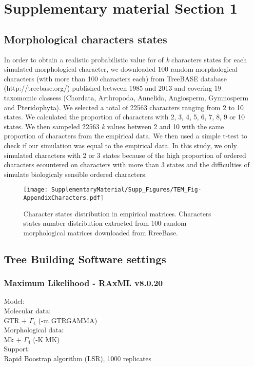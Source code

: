 \section{Supplementary material Section 1}

\subsection{Morphological characters states}
In order to obtain a realistic probabilistic value for of \textit{k} characters states for each simulated morphological character, we downloaded 100 random morphological characters (with more than 100 characters each) from TreeBASE database (http://treebase.org/) published between 1985 and 2013 and covering 19 taxomomic classess (Chordata, Arthropoda, Annelida, Angiosperm, Gymnosperm and Pteridophyta).
We selected a total of 22563 characters ranging from 2 to 10 states.
We calculated the proportion of characters with 2, 3, 4, 5, 6, 7, 8, 9 or 10 states.
We then sampeled 22563 \textit{k} values between 2 and 10 with the same proportion of characters from the empirical data.
We then used a simple t-test to check if our simulation was equal to the empirical data.
In this study, we only simulated characters with 2 or 3 states because of the high proportion of ordered characters ecountered on characters with more than 3 states and the difficulties of simulate biologicaly sensible ordered characters.

\begin{figure}
\centering
\texttt{[image: SupplementaryMaterial/Supp\_Figures/TEM\_Fig-AppendixCharacters.pdf]}
\caption{Character states distribution in empirical matrices. %
Characters states number distribution extracted from 100 random morphological matrices downloaded from RreeBase.}
\label{Fig_AppendixCharacters}
\end{figure}


\subsection{Tree Building Software settings}

\subsubsection{Maximum Likelihood - RAxML v8.0.20 \citep{Stamatakis21012014}}

Model: \\
Molecular data: \\
GTR + $\Gamma_4$ (-m GTRGAMMA) \\
Morphological data: \\
Mk + $\Gamma_4$ (-K MK) \\
Support: \\
Rapid Boostrap algorithm (LSR), 1000 replicates \\

